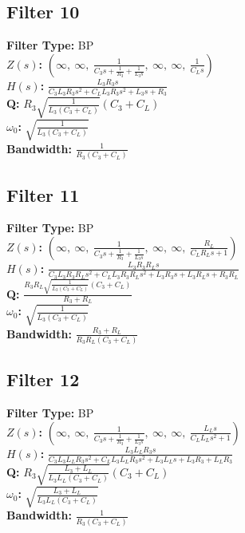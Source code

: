 \documentclass{article}
\begin{document}
\subsection*{Filter 10}
\textbf{Filter Type:} BP \\ 
\textbf{$Z(s)$:} $\left( \infty, \  \infty, \  \frac{1}{C_{3} s + \frac{1}{R_{3}} + \frac{1}{L_{3} s}}, \  \infty, \  \infty, \  \frac{1}{C_{L} s}\right)$ \\ 
\textbf{$H(s)$:} $\frac{L_{3} R_{3} s}{C_{3} L_{3} R_{3} s^{2} + C_{L} L_{3} R_{3} s^{2} + L_{3} s + R_{3}}$ \\ 
\textbf{Q:} $R_{3} \sqrt{\frac{1}{L_{3} \left(C_{3} + C_{L}\right)}} \left(C_{3} + C_{L}\right)$ \\ 
\textbf{$\omega_0$:} $\sqrt{\frac{1}{L_{3} \left(C_{3} + C_{L}\right)}}$ \\ 
\textbf{Bandwidth:} $\frac{1}{R_{3} \left(C_{3} + C_{L}\right)}$ \\ 
\subsection*{Filter 11}
\textbf{Filter Type:} BP \\ 
\textbf{$Z(s)$:} $\left( \infty, \  \infty, \  \frac{1}{C_{3} s + \frac{1}{R_{3}} + \frac{1}{L_{3} s}}, \  \infty, \  \infty, \  \frac{R_{L}}{C_{L} R_{L} s + 1}\right)$ \\ 
\textbf{$H(s)$:} $\frac{L_{3} R_{3} R_{L} s}{C_{3} L_{3} R_{3} R_{L} s^{2} + C_{L} L_{3} R_{3} R_{L} s^{2} + L_{3} R_{3} s + L_{3} R_{L} s + R_{3} R_{L}}$ \\ 
\textbf{Q:} $\frac{R_{3} R_{L} \sqrt{\frac{1}{L_{3} \left(C_{3} + C_{L}\right)}} \left(C_{3} + C_{L}\right)}{R_{3} + R_{L}}$ \\ 
\textbf{$\omega_0$:} $\sqrt{\frac{1}{L_{3} \left(C_{3} + C_{L}\right)}}$ \\ 
\textbf{Bandwidth:} $\frac{R_{3} + R_{L}}{R_{3} R_{L} \left(C_{3} + C_{L}\right)}$ \\ 
\subsection*{Filter 12}
\textbf{Filter Type:} BP \\ 
\textbf{$Z(s)$:} $\left( \infty, \  \infty, \  \frac{1}{C_{3} s + \frac{1}{R_{3}} + \frac{1}{L_{3} s}}, \  \infty, \  \infty, \  \frac{L_{L} s}{C_{L} L_{L} s^{2} + 1}\right)$ \\ 
\textbf{$H(s)$:} $\frac{L_{3} L_{L} R_{3} s}{C_{3} L_{3} L_{L} R_{3} s^{2} + C_{L} L_{3} L_{L} R_{3} s^{2} + L_{3} L_{L} s + L_{3} R_{3} + L_{L} R_{3}}$ \\ 
\textbf{Q:} $R_{3} \sqrt{\frac{L_{3} + L_{L}}{L_{3} L_{L} \left(C_{3} + C_{L}\right)}} \left(C_{3} + C_{L}\right)$ \\ 
\textbf{$\omega_0$:} $\sqrt{\frac{L_{3} + L_{L}}{L_{3} L_{L} \left(C_{3} + C_{L}\right)}}$ \\ 
\textbf{Bandwidth:} $\frac{1}{R_{3} \left(C_{3} + C_{L}\right)}$ \\ 
\end{document}
